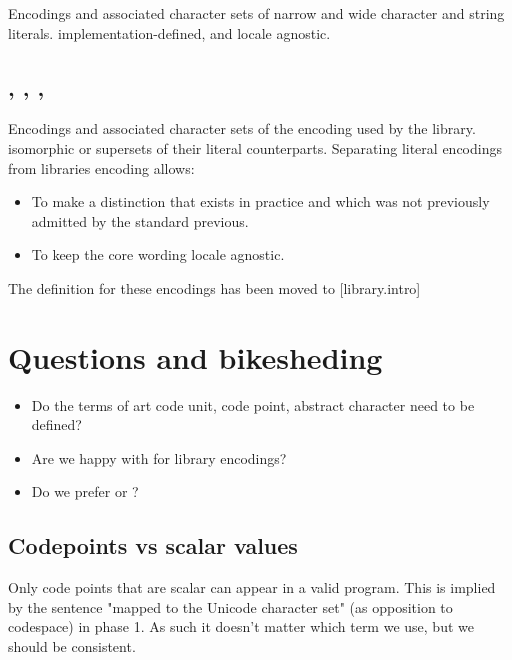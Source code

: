 \documentclass{wg21}
\begin{document}
Encodings and associated character sets of narrow and wide character and string literals. implementation-defined, and locale agnostic.



\subsection{, , , }

Encodings and associated character sets of the encoding used by the library. isomorphic or supersets of their literal counterparts.
Separating literal encodings from libraries encoding allows:

\begin{itemize}
    \item To make a distinction that exists in practice and which was not previously admitted by the standard previous.
    \item To keep the core wording locale agnostic.
\end{itemize}

The definition for these encodings has been moved to [library.intro]

\section{Questions and bikesheding}

\begin{itemize}
    \item Do the terms of art code unit, code point, abstract character need to be defined?
    \item Are we happy with  for library encodings?
    \item Do we prefer  or  ?
\end{itemize}

\subsection{Codepoints vs scalar values}

Only code points that are scalar can appear in a valid program.
This is implied by the sentence "mapped to the Unicode character set" (as opposition to codespace) in phase 1.
As such it doesn't matter which term we use, but we should be consistent.
\end{document}
